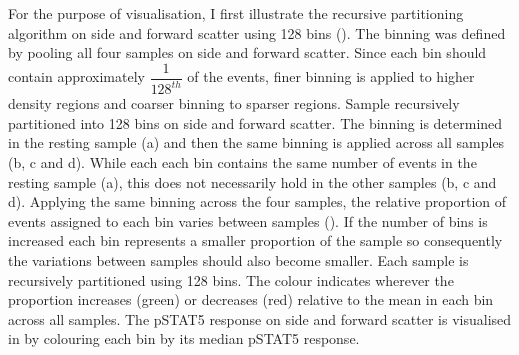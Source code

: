For the purpose of visualisation, I first illustrate the recursive partitioning algorithm on side and forward scatter using 128 bins ().
The binning was defined by pooling all four samples on side and forward scatter.
Since each bin should contain approximately $\dfrac{1}{128^{th}}$ of the events, finer binning is applied to higher density regions and coarser binning to sparser regions.
{Sample recursively partitioned into 128 bins on side and forward scatter.}
{
   The binning is determined in the resting sample (a) and then the same binning is applied across all samples (b, c and d).
   While each each bin contains the same number of events in the resting sample (a), this does not necessarily hold in the
   other samples (b, c and d).
}
Applying the same binning across the four samples, the relative proportion of events assigned to each bin varies between samples ().
If the number of bins is increased each bin represents a smaller proportion of the sample so consequently the variations between samples should also become smaller.
{Each sample is recursively partitioned using 128 bins.}
{
  The colour indicates wherever the proportion increases (green) or decreases (red) relative to the mean in each bin across all samples.
}
The pSTAT5 response on side and forward scatter is visualised in  by colouring each bin by its median pSTAT5 response.
